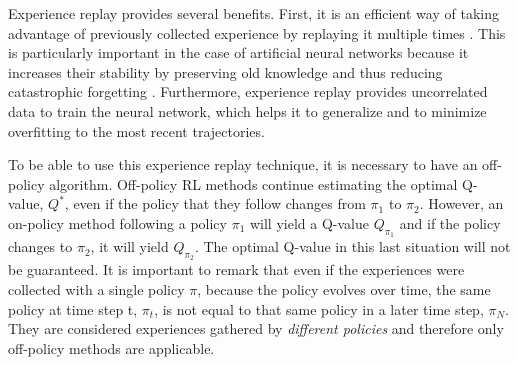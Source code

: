 Experience replay provides several benefits. First, it is an efficient way of taking advantage of previously collected experience by replaying it multiple times \cite{Experience-Replay-zhang:2018}. This is particularly important in the case of artificial neural networks because it increases their stability by preserving old knowledge and thus reducing catastrophic forgetting \cite{Experience_replay_stability:2019}. Furthermore, experience replay provides uncorrelated data to train the neural network, which helps it to generalize and to minimize overfitting to the most recent trajectories.

 

To be able to use this experience replay technique, it is necessary to have an off-policy algorithm. Off-policy RL methods continue estimating the optimal Q-value, $Q^*$, even if the policy that they follow changes from $\pi_1$ to $\pi_2$. However, an on-policy method following a policy $\pi_1$ will yield a Q-value $Q_{\pi_1}$ and if the policy changes to $\pi_2$, it will yield $Q_{\pi_2}$. The optimal Q-value in this last situation will not be guaranteed. It is important to remark that even if the experiences were collected with a single policy $\pi$, because the policy evolves over time, the same policy at time step t, $\pi_t$, is not equal to that same policy in a later time step, $\pi_N$. They are considered experiences gathered by \textit{different policies} and therefore only off-policy methods are applicable.








